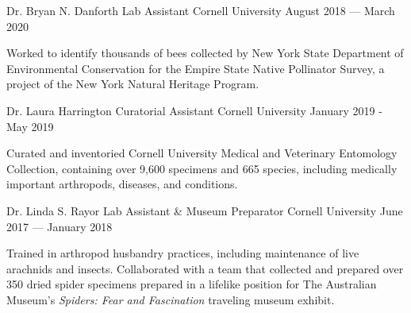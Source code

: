 \begin{cventries}
  \cventry
    {Dr. Bryan N. Danforth} %
    {Lab Assistant} %
    {Cornell University} %
    {August 2018 — March 2020} %
    {
      \begin{cvitems} %
        \item {Worked to identify thousands of bees collected by New York State Department of Environmental Conservation for the Empire State Native Pollinator Survey, a project of the New York Natural Heritage Program.}
      \end{cvitems}
    }

  \cventry
    {Dr. Laura Harrington} %
    {Curatorial Assistant} %
    {Cornell University} %
    {January 2019 - May 2019} %
    {
      \begin{cvitems} %
        \item {Curated and inventoried Cornell University Medical and Veterinary Entomology Collection, containing over 9,600 specimens and 665 species, including medically important arthropods, diseases, and conditions.}
      \end{cvitems}
    }

  \cventry
    {Dr. Linda S. Rayor} %
    {Lab Assistant \& Museum Preparator} %
    {Cornell University} %
    {June 2017 — January 2018} %
    {
      \begin{cvitems} %
        \item {Trained in arthropod husbandry practices, including maintenance of live arachnids and insects. Collaborated with a team that collected and prepared over 350 dried spider specimens prepared in a lifelike position for The Australian Museum’s \textit{Spiders: Fear and Fascination} traveling museum exhibit.}
      \end{cvitems}
    }

\end{cventries}
